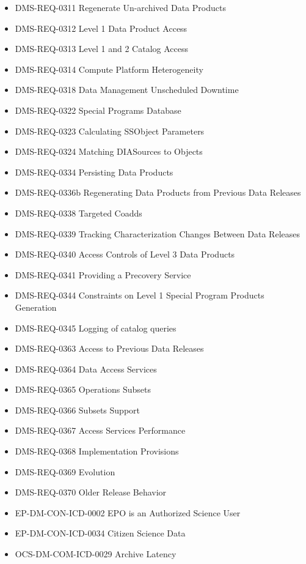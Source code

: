\begin{itemize}
\item DMS-REQ-0311 Regenerate Un-archived Data Products
\item DMS-REQ-0312 Level 1 Data Product Access
\item DMS-REQ-0313 Level 1 and 2 Catalog Access
\item DMS-REQ-0314 Compute Platform Heterogeneity
\item DMS-REQ-0318 Data Management Unscheduled Downtime
\item DMS-REQ-0322 Special Programs Database
\item DMS-REQ-0323 Calculating SSObject Parameters
\item DMS-REQ-0324 Matching DIASources to Objects
\item DMS-REQ-0334 Persisting Data Products
\item DMS-REQ-0336b Regenerating Data Products from Previous Data Releases
\item DMS-REQ-0338 Targeted Coadds
\item DMS-REQ-0339 Tracking Characterization Changes Between Data Releases
\item DMS-REQ-0340 Access Controls of Level 3 Data Products
\item DMS-REQ-0341 Providing a Precovery Service
\item DMS-REQ-0344 Constraints on Level 1 Special Program Products Generation
\item DMS-REQ-0345 Logging of catalog queries
\item DMS-REQ-0363 Access to Previous Data Releases
\item DMS-REQ-0364 Data Access Services
\item DMS-REQ-0365 Operations Subsets
\item DMS-REQ-0366 Subsets Support
\item DMS-REQ-0367 Access Services Performance
\item DMS-REQ-0368 Implementation Provisions
\item DMS-REQ-0369 Evolution
\item DMS-REQ-0370 Older Release Behavior
\item EP-DM-CON-ICD-0002 EPO is an Authorized Science User
\item EP-DM-CON-ICD-0034 Citizen Science Data
\item OCS-DM-COM-ICD-0029 Archive Latency
\end{itemize}
